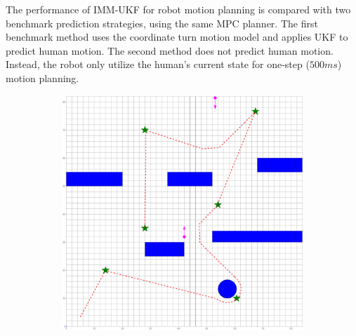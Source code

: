 \documentclass[letterpaper, 10 pt, conference]{ieeeconf}
\begin{document}
	The performance of IMM-UKF for robot motion planning is compared with two benchmark prediction strategies, using the same MPC planner.
	The first benchmark method uses the coordinate turn motion model and applies UKF to predict human motion.
	The second method does not predict human motion.
	Instead, the robot only utilize the human's current state for one-step ($500ms$) motion planning.
	
	\begin{figure}
		\centering
		\begin{subfigure}{0.2\textwidth}
			\includegraphics[width=\textwidth]{figures/ref_traj_end}
			\caption{}
			\label{fig:ref_traj_obs1}
		\end{subfigure}
		~
		\begin{subfigure}{0.2\textwidth}

\end{subfigure}
\end{figure}
\end{document}
